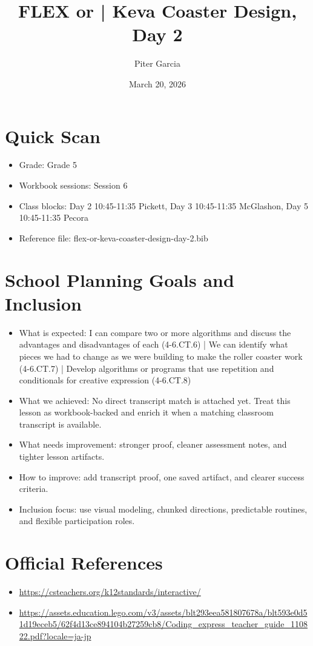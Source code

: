 \documentclass[11pt]{article}
\title{FLEX or | Keva Coaster Design, Day 2}
\author{Piter Garcia}
\date{March 20, 2026}
\begin{document}
    \maketitle
    \section*{Quick Scan}
    \begin{itemize}[leftmargin=*]
    \item Grade: Grade 5
    \item Workbook sessions: Session 6
    \item Class blocks: Day 2 10:45-11:35 Pickett, Day 3 10:45-11:35 McGlashon, Day 5 10:45-11:35 Pecora
    \item Reference file: flex-or-keva-coaster-design-day-2.bib
    \end{itemize}
    \section*{School Planning Goals and Inclusion}
    \begin{itemize}[leftmargin=*]
    \item What is expected: I can compare two or more algorithms and discuss the advantages and disadvantages of each (4-6.CT.6) | We can identify what pieces we had to change as we were building to make the roller coaster work (4-6.CT.7) | Develop algorithms or programs that use repetition and conditionals for creative expression (4-6.CT.8)
    \item What we achieved: No direct transcript match is attached yet. Treat this lesson as workbook-backed and enrich it when a matching classroom transcript is available.
    \item What needs improvement: stronger proof, cleaner assessment notes, and tighter lesson artifacts.
    \item How to improve: add transcript proof, one saved artifact, and clearer success criteria.
    \item Inclusion focus: use visual modeling, chunked directions, predictable routines, and flexible participation roles.
    \end{itemize}
    \section*{Official References}
    \begin{itemize}[leftmargin=*]
    \item \url{https://csteachers.org/k12standards/interactive/}
\item \url{https://assets.education.lego.com/v3/assets/blt293eea581807678a/blt593e0d51d19eceb5/62f4d13ce894104b27259cb8/Coding_express_teacher_guide_110822.pdf?locale=ja-jp}

    \end{itemize}
    
\end{document}
